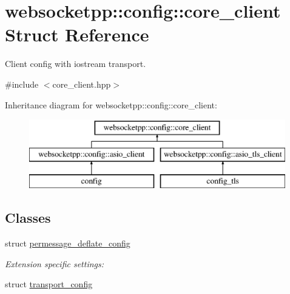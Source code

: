 \hypertarget{structwebsocketpp_1_1config_1_1core__client}{}\section{websocketpp\+:\+:config\+:\+:core\+\_\+client Struct Reference}
\label{structwebsocketpp_1_1config_1_1core__client}


Client config with iostream transport.  




{\ttfamily \#include $<$core\+\_\+client.\+hpp$>$}

Inheritance diagram for websocketpp\+:\+:config\+:\+:core\+\_\+client\+:\begin{figure}[H]
\begin{center}
\leavevmode
\includegraphics[height=3.000000cm]{structwebsocketpp_1_1config_1_1core__client}
\end{center}
\end{figure}
\subsection*{Classes}
\begin{DoxyCompactItemize}
\item 
struct \hyperlink{structwebsocketpp_1_1config_1_1core__client_1_1permessage__deflate__config}{permessage\+\_\+deflate\+\_\+config}
\begin{DoxyCompactList}\small\item\em Extension specific settings\+: \end{DoxyCompactList}\item 
struct \hyperlink{structwebsocketpp_1_1config_1_1core__client_1_1transport__config}{transport\+\_\+config}
\end{DoxyCompactItemize}
